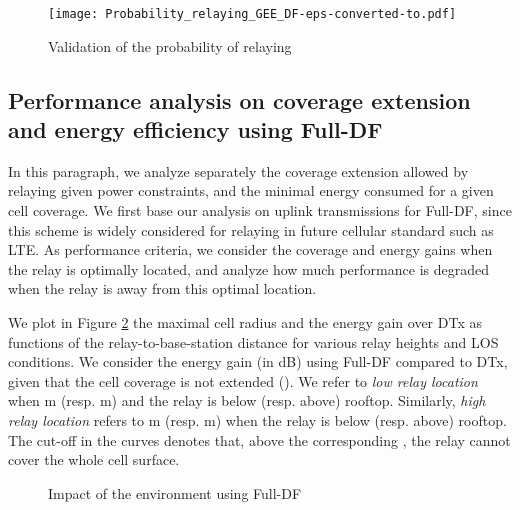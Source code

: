 \documentclass[journal]{IEEEtran}
\theoremstyle{definition}
\begin{document}
\begin{figure}

	    \centering \hspace*{-30pt} \texttt{[image: Probability\_relaying\_GEE\_DF-eps-converted-to.pdf]}

	\caption{Validation of the probability of relaying }  
	 \label{fig:validity_model_prob}

\end{figure}


\subsection{Performance analysis on coverage extension and energy efficiency using Full-DF}

In this paragraph, we analyze separately the coverage extension allowed by relaying given power constraints, and the minimal energy consumed for a given cell coverage.
We first base our analysis on uplink transmissions for Full-DF, since this scheme is widely considered for relaying in future cellular standard such as LTE. As performance criteria, we consider the coverage and energy gains when the relay is optimally located, and analyze how much performance is degraded when the relay is away from this optimal location.

We plot in Figure \ref{fig:Perf_FullDF} the maximal cell radius and the energy gain over DTx as functions of the relay-to-base-station distance  for various relay heights and LOS conditions.
We consider the energy gain (in dB) using Full-DF compared to DTx, given that the cell coverage is not extended (). 
We refer to \textit{low relay location} when m (resp. m) and the relay is below (resp. above) rooftop. Similarly, \textit{high relay location} refers to m (resp. m) when the relay is below (resp. above) rooftop.
The cut-off in the curves denotes that, above the corresponding , the relay cannot cover the whole cell surface.

\begin{figure}
	{\centering 
	\caption{Impact of the environment using Full-DF}  
	\label{fig:Perf_FullDF} 
	}
\end{figure}
\end{document}
